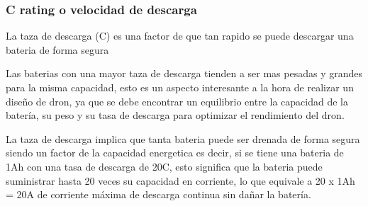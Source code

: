 \documentclass[pdflatex,sn-mathphys-num]{sn-jnl}%
\begin{document}
\subsubsection{C rating o velocidad de descarga}
La taza de descarga (C) es una factor de que tan rapido se puede descargar una bateria de forma segura

Las baterias con una mayor taza de descarga tienden a ser mas pesadas y grandes para la misma capacidad, esto es un aspecto interesante a la hora de realizar un diseño de dron, ya que se debe encontrar un equilibrio entre la capacidad de la batería, su peso y su tasa de descarga para optimizar el rendimiento del dron.
\cite{oscarlipo}

La taza de descarga implica que tanta bateria puede ser drenada de forma segura siendo un factor de la capacidad energetica es decir, si se tiene una bateria de 1Ah con una tasa de descarga de 20C, esto significa que la bateria puede suministrar hasta 20 veces su capacidad en corriente, lo que equivale a 20 x 1Ah = 20A de corriente máxima de descarga continua sin dañar la batería. 
\cite{rclipo}
\end{document}
